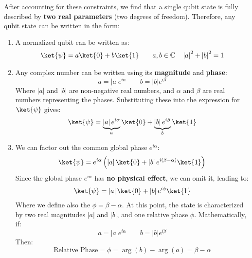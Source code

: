 After accounting for these constraints, we find that a single qubit state is fully described by \textbf{two real parameters} (two degrees of freedom). Therefore, any qubit state can be written in the form:
\begin{enumerate}
    \item A normalized qubit can be written as:
    \begin{equation*}
        \ket{\psi} = a\ket{0} + b\ket{1} \qquad a,b \in \mathbb{C} \quad \left|a\right|^{2} + \left|b\right|^{2} = 1
    \end{equation*}
    
    
    \item Any complex number can be written using its \textbf{magnitude} and \textbf{phase}:
    \begin{equation*}
        a = \left|a\right| e^{i\alpha} \qquad b = \left|b\right| e^{i\beta}
    \end{equation*}
    Where $\left|a\right|$ and $\left|b\right|$ are non-negative real numbers, and $\alpha$ and $\beta$ are real numbers representing the phases. Substituting these into the expression for $\ket{\psi}$ gives:
    \begin{equation*}
        \ket{\psi} = \underbrace{\left|a\right| e^{i\alpha}}_{a} \ket{0} + \underbrace{\left|b\right| e^{i\beta}}_{b} \ket{1}
    \end{equation*}
    
    
    \item We can factor out the common global phase $e^{i\alpha}$:
    \begin{equation*}
        \ket{\psi} = e^{i\alpha} \left( \left|a\right| \ket{0} + \left|b\right| e^{i(\beta - \alpha)} \ket{1} \right)
    \end{equation*}
    Since the global phase $e^{i\alpha}$ has \textbf{no physical effect}, we can omit it, leading to:
    \begin{equation*}
        \ket{\psi} = \left|a\right| \ket{0} + \left|b\right| e^{i\phi} \ket{1}
    \end{equation*}
    Where we define also the  $\phi = \beta - \alpha$. At this point, the state is characterized by two real magnitudes $\left|a\right|$ and $\left|b\right|$, and one relative phase $\phi$. Mathematically, if:
    \begin{equation*}
        a = \left|a\right| e^{i\alpha} \qquad b = \left|b\right| e^{i\beta}
    \end{equation*}
    Then:
    \begin{equation}
        \text{Relative Phase} = \phi = \arg\left(b\right) - \arg\left(a\right) = \beta - \alpha
    \end{equation}



\end{enumerate}
